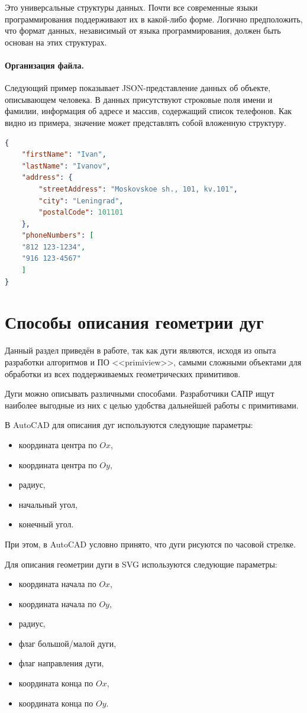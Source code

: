 Это универсальные структуры данных. Почти все современные языки программирования поддерживают их в какой-либо форме. Логично предположить, что формат данных, независимый от языка программирования, должен быть основан на этих структурах.

\paragraph{Организация файла.} Следующий пример показывает JSON-представление данных об объекте, описывающем человека. В данных присутствуют строковые поля имени и фамилии, информация об адресе и массив, содержащий список телефонов. Как видно из примера, значение может представлять собой вложенную структуру.
\begin{lstlisting}[language=json,label=list:json]
{
	"firstName": "Ivan",
	"lastName": "Ivanov",
	"address": {
		"streetAddress": "Moskovskoe sh., 101, kv.101",
		"city": "Leningrad",
		"postalCode": 101101
	},
	"phoneNumbers": [
	"812 123-1234",
	"916 123-4567"
	]
}
\end{lstlisting}

\section{Способы описания геометрии дуг} \label{sec:arcs}

Данный раздел приведён в работе, так как дуги являются, исходя из опыта разработки алгоритмов и ПО <<primiview>>, самыми сложными объектами для обработки из всех поддерживаемых геометрических примитивов.

Дуги можно описывать различными способами. Разработчики САПР ищут наиболее выгодные из них с целью удобства дальнейшей работы с примитивами.

В AutoCAD для описания дуг используются следующие параметры:
\begin{itemize}
	\item координата центра по $Ox$,
	\item координата центра по $Oy$,
	\item радиус,
	\item начальный угол,
	\item конечный угол.
\end{itemize}

При этом, в AutoCAD условно принято, что дуги рисуются по часовой стрелке.

Для описания геометрии дуги в SVG используются следующие параметры:
\begin{itemize}
	\item координата начала по $Ox$,
	\item координата начала по $Oy$,
	\item радиус,
	\item флаг большой/малой дуги,
	\item флаг направления дуги,
	\item координата конца по $Ox$,
	\item координата конца по $Oy$.
\end{itemize}

